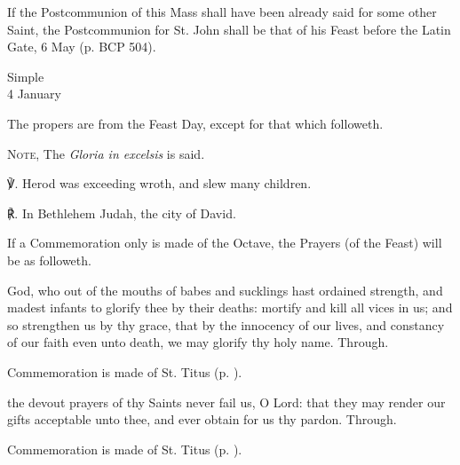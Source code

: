 \begin{rubric}
	If the Postcommunion of this Mass shall have been already said for some other Saint, the Postcommunion for St. John shall be that of his Feast before the Latin Gate, 6 May (p. BCP 504).
\end{rubric}


\begin{inhead}
    {Simple\\
4 January}
\end{inhead}

\begin{rubric}
	The propers are from the Feast Day, except for that which followeth.\par
	\textsc{Note,} The \emph{Gloria in excelsis} is said.
\end{rubric}

℣. Herod was exceeding wroth, and slew many children.

℟. In Bethlehem Judah, the city of David.\\


\begin{rubric}
	If a Commemoration only is made of the Octave, the Prayers (of the Feast) will be as followeth.
\end{rubric}

\collect
{} God, who out of the mouths of babes and sucklings hast ordained strength, and madest infants to glorify thee by their deaths: mortify and kill all vices in us; and so strengthen us by thy grace, that by the innocency of our lives, and constancy of our faith even unto death, we may glorify thy holy name. Through.

\begin{rubric}
	Commemoration is made of St. Titus (p. \pageref{TitusCollect}).
\end{rubric}

\secret
{} the devout prayers of thy Saints never fail us, O Lord: that they may render our gifts acceptable unto thee, and ever obtain for us thy pardon. Through.

\begin{rubric}
	Commemoration is made of St. Titus (p. \pageref{TitusSecret}).
\end{rubric}

